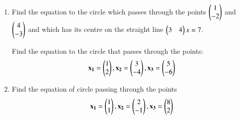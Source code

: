 \renewcommand{\theequation}{\theenumi}
\renewcommand{\thefigure}{\theenumi}
\begin{enumerate}[label=\thesubsection.\arabic*.,ref=\thesubsection.\theenumi]

\item Find the equation to the circle which passes through the points $\begin{pmatrix} 1 \\ -2 \end{pmatrix}$ and $\begin{pmatrix} 4 \\ -3 \end{pmatrix}$ and which has its centre on the straight line $\begin{pmatrix} 3 & 4 \end{pmatrix}x = 7$.
%
\\
\solution

Find the equation to the circle that passes through the points:
\begin{align}
\mathbf{x_1} = \begin{pmatrix}1\\2\end{pmatrix},\mathbf{x_2} = \begin{pmatrix}3\\-4\end{pmatrix} , \mathbf{x_3} = \begin{pmatrix}5\\-6\end{pmatrix}
\end{align}
\solution

\item Find the equation of circle passing through the points
\begin{align}
    \mathbf{x_1}=\begin{pmatrix}1\\1\end{pmatrix}, \mathbf{x_2}=\begin{pmatrix}2\\-1\end{pmatrix}, \mathbf{x_3}=\begin{pmatrix}8\\2\end{pmatrix}\label{eq:solutions/17/17/eq:0}
\end{align}
%
\\
\solution

\end{enumerate}
